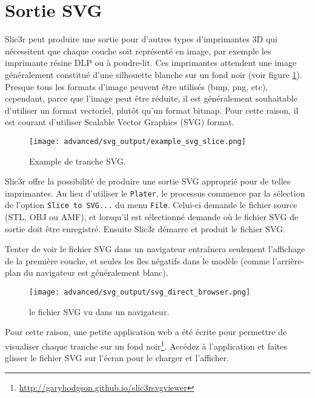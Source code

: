 
\section{Sortie SVG} %
\label{sec:svg_output}

Slic3r peut produire une sortie pour d'autres types d'imprimantes 3D qui nécessitent que chaque couche soit représenté en image, par exemple les imprimante résine DLP ou à poudre-lit. Ces imprimantes attendent une image généralement constitué d'une silhouette blanche sur un fond noir (voir figure \ref{fig:example_svg_slice}).  Presque tous les formats d'image peuvent être utilisés (bmp, png, etc), cependant, parce que l'image peut être réduite, il est généralement souhaitable d'utiliser un format vectoriel, plutôt qu'un format bitmap. Pour cette raison, il est courant d'utiliser Scalable Vector Graphics (SVG) format.

\begin{figure}[H]
\centering
\texttt{[image: advanced/svg\_output/example\_svg\_slice.png]}
\caption{Example de tranche SVG.}
\label{fig:example_svg_slice}
\end{figure}


Slic3r offre la possibilité de produire une sortie SVG approprié pour de telles imprimantes.  Au lieu d'utiliser le \texttt{Plater}, le processus commence par la sélection de l'option \texttt{Slice to SVG...} du menu \texttt{File}.  Celui-ci demande le fichier source (STL, OBJ ou AMF), et lorsqu'il est sélectionné demande où le fichier SVG de sortie doit être enregistré. Ensuite Slic3r démarre et produit le fichier SVG.

Tenter de voir le fichier SVG dans un navigateur entraînera seulement l'affichage de la première couche, et seules les îles négatifs dans le modèle (comme l'arrière-plan du navigateur est généralement blanc).

\begin{figure}[H]
\centering
\texttt{[image: advanced/svg\_output/svg\_direct\_browser.png]}
\caption{le fichier SVG vu dans un navigateur.}
\label{fig:svg_direct_browser}
\end{figure}

Pour cette raison, une petite application web a été écrite pour permettre de visualiser chaque tranche sur un fond noir\footnote{\url{http://garyhodgson.github.io/slic3rsvgviewer}}.  Accédez à l'application et faites glisser le fichier SVG sur l'écran pour le charger et l'afficher.

